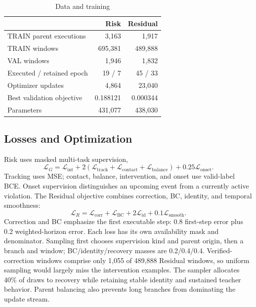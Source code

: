 \documentclass[letterpaper,10pt,conference]{ieeeconf}
\begin{document}
\begin{table}[t]
\centering
\caption{Data and training}
\label{tab:training}
\begin{tabular}{lrr}
\toprule
 & Risk & Residual\\
\midrule
TRAIN parent executions & 3,163 & 1,917\\
TRAIN windows & 695,381 & 489,888\\
VAL windows & 1,946 & 1,832\\
Executed / retained epoch & 19 / 7 & 45 / 33\\
Optimizer updates & 4,864 & 23,040\\
Best validation objective & 0.188121 & 0.000344\\
Parameters & 431,077 & 438,030\\
\bottomrule
\end{tabular}
\end{table}

\subsection{Losses and Optimization}
Risk uses masked multi-task supervision,
\begin{equation}
 \mathcal{L}_{G}=\mathcal{L}_{\mathrm{int}}
 +2(\mathcal{L}_{\mathrm{track}}+\mathcal{L}_{\mathrm{contact}}
 +\mathcal{L}_{\mathrm{balance}})+0.25\mathcal{L}_{\mathrm{onset}}.
\end{equation}
Tracking uses MSE; contact, balance, intervention, and onset use valid-label BCE. Onset supervision distinguishes an upcoming event from a currently active violation. The Residual objective combines correction, BC, identity, and temporal smoothness:
\begin{equation}
 \mathcal{L}_{R}=\mathcal{L}_{\mathrm{corr}}+\mathcal{L}_{\mathrm{BC}}
 +2\mathcal{L}_{\mathrm{id}}+0.1\mathcal{L}_{\mathrm{smooth}}.
\end{equation}
Correction and BC emphasize the first executable step: 0.8 first-step error plus 0.2 weighted-horizon error. Each loss has its own availability mask and denominator. Sampling first chooses supervision kind and parent origin, then a branch and window; BC/identity/recovery masses are 0.2/0.4/0.4. Verified-correction windows comprise only 1,055 of 489,888 Residual windows, so uniform sampling would largely miss the intervention examples. The sampler allocates 40\% of draws to recovery while retaining stable identity and sustained teacher behavior. Parent balancing also prevents long branches from dominating the update stream.
\end{document}
